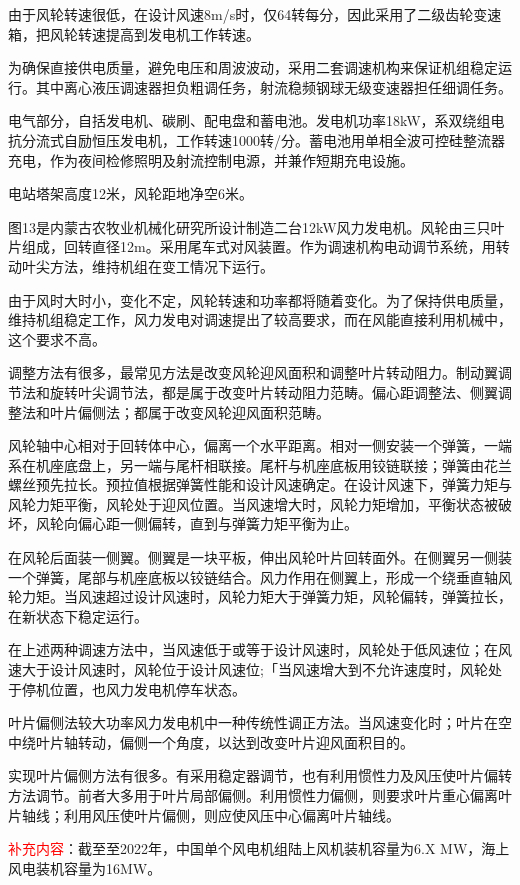 \documentclass{ctexbook}
\begin{document}
由于风轮转速很低，在设计风速8m/s时，仅64转每分，因此采用了二级齿轮变速箱，把风轮转速提高到发电机工作转速。

为确保直接供电质量，避免电压和周波波动，采用二套调速机构来保证机组稳定运行。其中离心液压调速器担负粗调任务，射流稳频钢球无级变速器担任细调任务。

电气部分，自括发电机、碳刷、配电盘和蓄电池。发电机功率18kW，系双绕组电抗分流式自励恒压发电机，工作转速1000转/分。蓄电池用单相全波可控硅整流器充电，作为夜间检修照明及射流控制电源，并兼作短期充电设施。

电站塔架高度12米，风轮距地净空6米。

图13是内蒙古农牧业机械化研究所设计制造二台12kW风力发电机。风轮由三只叶片组成，回转直径12m。采用尾车式对风装置。作为调速机构电动调节系统，用转动叶尖方法，维持机组在变工情况下运行。

由于风时大时小，变化不定，风轮转速和功率都将随着变化。为了保持供电质量，维持机组稳定工作，风力发电对调速提出了较高要求，而在风能直接利用机械中，这个要求不高。

调整方法有很多，最常见方法是改变风轮迎风面积和调整叶片转动阻力。制动翼调节法和旋转叶尖调节法，都是属于改变叶片转动阻力范畴。偏心距调整法、侧翼调整法和叶片偏侧法；都属于改变风轮迎风面积范畴。

风轮轴中心相对于回转体中心，偏离一个水平距离。相对一侧安装一个弹簧，一端系在机座底盘上，另一端与尾杆相联接。尾杆与机座底板用铰链联接；弹簧由花兰螺丝预先拉长。预拉值根据弹簧性能和设计风速确定。在设计风速下，弹簧力矩与风轮力矩平衡，风轮处于迎风位置。当风速增大时，风轮力矩增加，平衡状态被破坏，风轮向偏心距一侧偏转，直到与弹簧力矩平衡为止。

在风轮后面装一侧翼。侧翼是一块平板，伸出风轮叶片回转面外。在侧翼另一侧装一个弹簧，尾部与机座底板以铰链结合。风力作用在侧翼上，形成一个绕垂直轴风轮力矩。当风速超过设计风速时，风轮力矩大于弹簧力矩，风轮偏转，弹簧拉长，在新状态下稳定运行。
	
在上述两种调速方法中，当风速低于或等于设计风速时，风轮处于低风速位；在风速大于设计风速时，风轮位于设计风速位;「当风速增大到不允许速度时，风轮处于停机位置，也风力发电机停车状态。

叶片偏侧法较大功率风力发电机中一种传统性调正方法。当风速变化时；叶片在空中绕叶片轴转动，偏侧一个角度，以达到改变叶片迎风面积目的。

实现叶片偏侧方法有很多。有采用稳定器调节，也有利用惯性力及风压使叶片偏转方法调节。前者大多用于叶片局部偏侧。利用惯性力偏侧，则要求叶片重心偏离叶片轴线；利用风压使叶片偏侧，则应使风压中心偏离叶片轴线。

\textcolor{red}{补充内容}：截至至2022年，中国单个风电机组陆上风机装机容量为6.X MW，海上风电装机容量为16MW。
\end{document}
